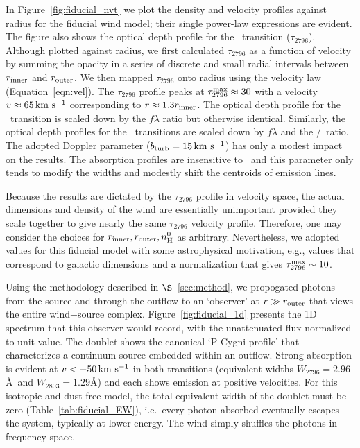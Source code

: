\documentclass[12pt,preprint]{aastex}
\begin{document}
In Figure~\ref{fig:fiducial_nvt} we plot the density and velocity
profiles against radius for the fiducial wind model;  
their single power-law expressions are evident.  The figure also
shows the optical depth profile for the \mgiia\ transition ($\tau_{2796}$).
Although plotted against radius, we first calculated $\tau_{2796}$ 
as a function of velocity by summing the opacity in a series of
discrete and small radial intervals
between $r_{\rm inner}$  and $r_{\rm outer}$.   We then mapped
$\tau_{2796}$ onto radius using the velocity law
(Equation~\ref{eqn:vel}). 
The $\tau_{2796}$ profile peaks at $\tau_{2796}^{\rm max} \approx 30$
with a velocity $v \approx 65 \, {\rm km~s^{-1}}$ corresponding to $r \approx 1.3
r_{\rm inner}$.  The optical depth profile for the \mgiib\ transition
is scaled down by the $f\lambda$ ratio but otherwise identical.  Similarly,
the optical depth profiles for the \feiid\ transitions are
scaled down by $f \lambda$ and the \nfe/\nmg\ ratio.  
The adopted Doppler parameter
($b_{\rm turb} = 15 \, {\rm km~s^{-1}}$) has only a modest impact on the results.
The absorption profiles are insensitive to \bturb\ and this parameter 
only tends to modify the widths and modestly
shift the centroids of emission lines.

Because the results are dictated by the $\tau_{2796}$ profile in
velocity space, the actual dimensions and density of the wind are
essentially unimportant provided they scale together to give nearly the same
$\tau_{2796}$ velocity profile.  Therefore, one may consider the choices for
$r_{\rm inner}, r_{\rm outer}, n_{\rm H}^0$ as arbitrary.
Nevertheless, we adopted values for this fiducial model with
some astrophysical motivation,  e.g., values that correspond to
galactic dimensions and a normalization that gives $\tau_{2796}^{\rm
  max} \sim 10$.


Using the methodology described in $\S$~\ref{sec:method}, we
propogated photons from the source and through the outflow to an
`observer' at $r \gg r_{\rm outer}$ that views the entire wind+source
complex.  Figure~\ref{fig:fiducial_1d} presents the 1D spectrum
that this observer would record, with the unattenuated flux
normalized to unit value.   The  doublet
shows the canonical `P-Cygni profile' that characterizes a continuum
source embedded within an outflow.  Strong absorption is evident at
$v < -50 \, {\rm km~s^{-1}}$ in both transitions (equivalent widths $W_{2796} =
2.96$\AA\ and $W_{2803} = 1.29$\AA) and each shows emission at
positive velocities.  For this isotropic and dust-free model, the
total equivalent width of the doublet must be zero
(Table~\ref{tab:fiducial_EW}), i.e.\ every photon
absorbed eventually escapes the system, typically at lower
energy.  The wind simply shuffles the photons in frequency space.
\end{document}
